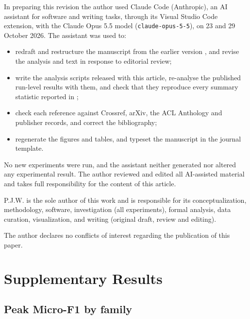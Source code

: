 \documentclass{ijis}
\begin{document}
In preparing this revision the author used Claude Code (Anthropic), an AI assistant for software and writing tasks, through its Visual Studio Code extension, with the Claude Opus 5.5 model (\texttt{claude-opus-5-5}), on 23 and 29 October 2026. The assistant was used to:
\begin{itemize}
\item redraft and restructure the manuscript from the earlier version \cite{worth2025layercake}, and revise the analysis and text in response to editorial review;
\item write the analysis scripts released with this article, re-analyse the published run-level results with them, and check that they reproduce every summary statistic reported in \cite{worth2025layercake};
\item check each reference against Crossref, arXiv, the ACL Anthology and publisher records, and correct the bibliography;
\item regenerate the figures and tables, and typeset the manuscript in the journal template.
\end{itemize}
No new experiments were run, and the assistant neither generated nor altered any experimental result. The author reviewed and edited all AI-assisted material and takes full responsibility for the content of this article.

P.J.W. is the sole author of this work and is responsible for its conceptualization, methodology, software, investigation (all experiments), formal analysis, data curation, visualization, and writing (original draft, review and editing).

The author declares no conflicts of interest regarding the publication of this paper.




\appendix
\renewcommand{\thesection}{\Alph{section}}
\setcounter{table}{0}
\renewcommand{\thetable}{A\arabic{table}}
\section{Supplementary Results}

\subsection{Peak Micro-F1 by family}\label{app:micro}
\end{document}
